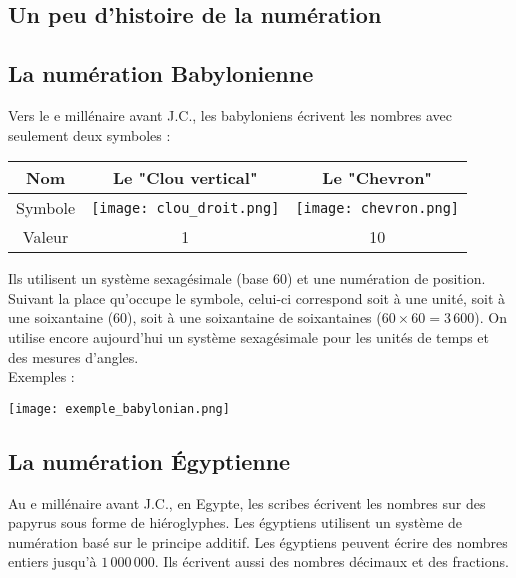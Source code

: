 \begin{pageCours} 

\section{Un peu d'histoire de la numération}

\subsection{La numération Babylonienne}

\begin{His}
Vers le e millénaire avant J.C., les babyloniens écrivent les nombres avec seulement deux symboles :\\
\begin{center}
\begin{tabular}{c|c|c}
Nom & Le "Clou vertical" & Le "Chevron" \\\hline
Symbole & \texttt{[image: clou\_droit.png]} & \texttt{[image: chevron.png]} \\\hline
Valeur & 1 & 10 \\
\end{tabular}
\end{center}

Ils utilisent un système sexagésimale (base $60$) et une numération de position. Suivant la place qu'occupe le symbole, celui-ci correspond soit à une unité, soit à une soixantaine ($60$), soit à une soixantaine de soixantaines ($60\times60=3\,600$). On utilise encore aujourd'hui un système sexagésimale pour les unités de temps et des mesures d'angles.\\

Exemples :
\begin{center}
\texttt{[image: exemple\_babylonian.png]}
\end{center}
\end{His}

\subsection{La numération Égyptienne}

\begin{His}
Au e millénaire avant J.C., en Egypte, les scribes écrivent les nombres sur des papyrus sous forme de hiéroglyphes. Les égyptiens utilisent un système de numération basé sur le principe additif. Les égyptiens peuvent écrire des nombres entiers jusqu'à $1\,000\,000$. Ils écrivent aussi des nombres décimaux et des fractions.


\end{His}
\end{pageCours}
